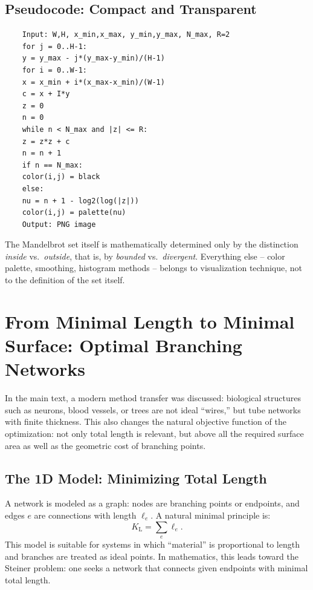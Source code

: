 \subsection{Pseudocode: Compact and Transparent}

\begin{verbatim}
	Input: W,H, x_min,x_max, y_min,y_max, N_max, R=2
	for j = 0..H-1:
	y = y_max - j*(y_max-y_min)/(H-1)
	for i = 0..W-1:
	x = x_min + i*(x_max-x_min)/(W-1)
	c = x + I*y
	z = 0
	n = 0
	while n < N_max and |z| <= R:
	z = z*z + c
	n = n + 1
	if n == N_max:
	color(i,j) = black
	else:
	nu = n + 1 - log2(log(|z|))
	color(i,j) = palette(nu)
	Output: PNG image
\end{verbatim}

\begin{NoteBox}
	\label{box:mandelbrot-reader-note}
	The Mandelbrot set itself is mathematically determined only by the distinction
	\emph{inside} vs.\ \emph{outside}, that is, by
	\emph{bounded} vs.\ \emph{divergent}.
	Everything else -- color palette, smoothing, histogram methods --
	belongs to visualization technique, not to the definition of the set itself.
\end{NoteBox}

\section{From Minimal Length to Minimal Surface: Optimal Branching Networks}
\label{app:netzwerke-minimalflaeche}

In the main text, a modern method transfer was discussed:
biological structures such as neurons, blood vessels, or trees are not ideal ``wires,''
but tube networks with finite thickness.
This also changes the natural objective function of the optimization:
not only total length is relevant, but above all the required surface area
as well as the geometric cost of branching points.

\subsection{The 1D Model: Minimizing Total Length}

A network is modeled as a graph: nodes are branching points or endpoints, and edges $e$ are connections with length $\ell_e$.
A natural minimal principle is:
\begin{equation}
	K_{\text{L}} = \sum_{e} \ell_e.
	\label{eq:cost_length}
\end{equation}
This model is suitable for systems in which ``material'' is proportional to length and branches are treated as ideal points.
In mathematics, this leads toward the Steiner problem: one seeks a network that connects given endpoints with minimal total length.

